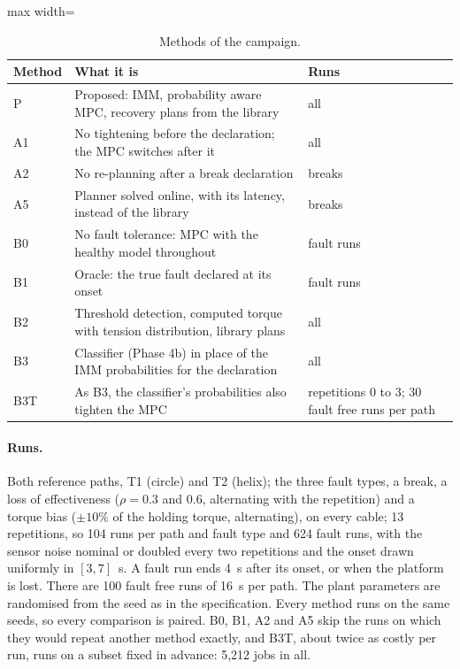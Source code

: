 \documentclass[10pt]{article}
\begin{document}
\begin{table}[h]
\centering\small
\caption{Methods of the campaign.}\label{tab:methods}
\begin{adjustbox}{max width=\linewidth}\begin{tabular}{@{}lll@{}}
\toprule
Method & What it is & Runs \\
\midrule
P & Proposed: IMM, probability aware MPC, recovery plans from the library & all \\
A1 & No tightening before the declaration; the MPC switches after it & all \\
A2 & No re-planning after a break declaration & breaks \\
A5 & Planner solved online, with its latency, instead of the library & breaks \\
B0 & No fault tolerance: MPC with the healthy model throughout & fault runs \\
B1 & Oracle: the true fault declared at its onset & fault runs \\
B2 & Threshold detection, computed torque with tension distribution, library plans & all \\
B3 & Classifier (Phase 4b) in place of the IMM probabilities for the declaration & all \\
B3T & As B3, the classifier's probabilities also tighten the MPC & repetitions 0 to 3; 30 fault free runs per path \\
\bottomrule
\end{tabular}\end{adjustbox}
\end{table}

\paragraph{Runs.} Both reference paths, T1 (circle) and T2 (helix); the three fault types, a break, a loss of effectiveness ($\rho=0.3$ and $0.6$, alternating with the repetition) and a torque bias ($\pm10\%$ of the holding torque, alternating), on every cable; 13 repetitions, so 104 runs per path and fault type and 624 fault runs, with the sensor noise nominal or doubled every two repetitions and the onset drawn uniformly in $[3,7]$~s. A fault run ends 4~s after its onset, or when the platform is lost. There are 100 fault free runs of 16~s per path. The plant parameters are randomised from the seed as in the specification. Every method runs on the same seeds, so every comparison is paired. B0, B1, A2 and A5 skip the runs on which they would repeat another method exactly, and B3T, about twice as costly per run, runs on a subset fixed in advance: 5,212 jobs in all.
\end{document}
